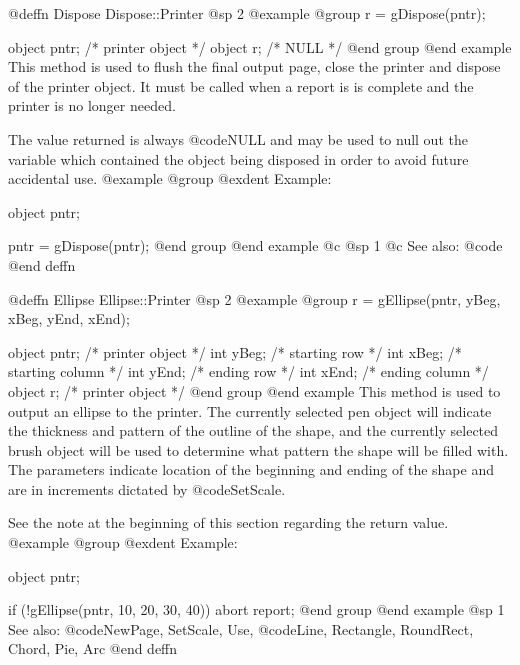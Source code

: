 @deffn {Dispose} Dispose::Printer
@sp 2
@example
@group
r = gDispose(pntr); 

object  pntr;   /*  printer object  */
object  r;      /*  NULL            */
@end group
@end example
This method is used to flush the final output page, close the printer and
dispose of the printer object.  It must be called when a report is
is complete and the printer is no longer needed.

The value returned is always @code{NULL} and may be used to null out
the variable which contained the object being disposed in order to
avoid future accidental use.
@example
@group
@exdent Example:

object  pntr;

pntr = gDispose(pntr);
@end group
@end example
@c @sp 1
@c See also:  @code{}
@end deffn
















@deffn {Ellipse} Ellipse::Printer
@sp 2
@example
@group
r = gEllipse(pntr, yBeg, xBeg, yEnd, xEnd);

object  pntr;   /*  printer object   */
int     yBeg;   /*  starting row     */
int     xBeg;   /*  starting column  */
int     yEnd;   /*  ending row       */
int     xEnd;   /*  ending column    */
object  r;      /*  printer object   */
@end group
@end example
This method is used to output an ellipse to the printer.  The currently
selected pen object will indicate the thickness and pattern of the
outline of the shape, and the currently selected brush object will be
used to determine what pattern the shape will be filled with.  The
parameters indicate location of the beginning and ending of the shape
and are in increments dictated by @code{SetScale}.

See the note at the beginning of this section regarding the return value.
@example
@group
@exdent Example:

object  pntr;

if (!gEllipse(pntr, 10, 20, 30, 40))
        abort report;
@end group
@end example
@sp 1
See also:  @code{NewPage, SetScale, Use,}
        @code{Line, Rectangle, RoundRect, Chord, Pie, Arc}
@end deffn













